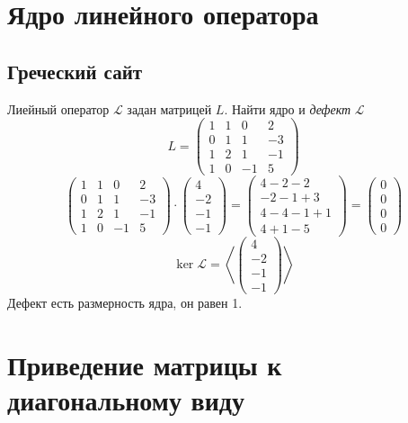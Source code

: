 \chapter{Ядро линейного оператора}

\section{Греческий сайт}

Лиейный оператор $ \mathcal{L} $ задан матрицей $ L $. Найти ядро и \textit{дефект} $ \mathcal{L} $
$$ L =
\begin{pmatrix}
	1 & 1 & 0 & 2 \\
    0 & 1 & 1 & -3 \\
    1 & 2 & 1 & -1 \\
    1 & 0 & -1 & 5
\end{pmatrix} $$
$$
\begin{pmatrix}
	1 & 1 & 0 & 2 \\
    0 & 1 & 1 & -3 \\
    1 & 2 & 1 & -1 \\
    1 & 0 & -1 & 5
\end{pmatrix} \cdot
\begin{pmatrix}
	4 \\
    -2 \\
    -1 \\
    -1
\end{pmatrix} =
\begin{pmatrix}
	4 - 2 - 2 \\
    -2 - 1 + 3 \\
    4 - 4 - 1 + 1 \\
    4 + 1 - 5
\end{pmatrix} =
\begin{pmatrix}
	0 \\
    0 \\
    0 \\
    0
\end{pmatrix} $$
$$ \ker \mathcal{L} = \left\langle
\begin{pmatrix}
	4 \\
    -2 \\
    -1 \\
    -1
\end{pmatrix} \right\rangle $$
Дефект есть размерность ядра, он равен 1.

\chapter{Приведение матрицы к диагональному виду}

